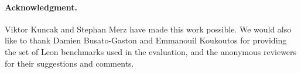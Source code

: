 
{%
\def\ackname{Acknowledgment}
\paragraph{%
\ackname.}
Viktor Kuncak and Stephan Merz have made this work possible. We would also like
to thank Damien Busato-Gaston and Emmanouil Koukoutos for providing the
set of Leon benchmarks used in the evaluation, and the anonymous reviewers for their
suggestions and comments.
}
%

{


}


